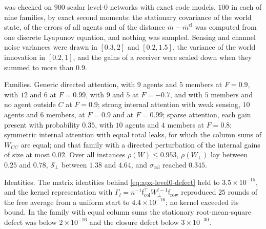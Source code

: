 \begin{numcheck}\label{chk:apx-level0}
 was checked on $900$ scalar level-0 networks with exact code models, $100$ in each of nine families, by exact second moments: the stationary covariance of the world state, of the errors of all agents and of the distance $\bar m-\bar m^{\mathrm{cl}}$ was computed from one discrete Lyapunov equation, and nothing was sampled. Sensing and channel noise variances were drawn in $[0.3,2]$ and $[0.2,1.5]$, the variance of the world innovation in $[0.2,1]$, and the gains of a receiver were scaled down when they summed to more than $0.9$.

Families. Generic directed attention, with $9$ agents and $5$ members at $F=0.9$, with $12$ and $6$ at $F=0.99$, with $9$ and $5$ at $F=-0.7$, and with $5$ members and no agent outside $C$ at $F=0.9$; strong internal attention with weak sensing, $10$ agents and $6$ members, at $F=0.9$ and at $F=0.99$; sparse attention, each gain present with probability $0.35$, with $10$ agents and $4$ members at $F=0.8$; symmetric internal attention with equal total leaks, for which the column sums of $W_{CC}$ are equal; and that family with a directed perturbation of the internal gains of size at most $0.02$. Over all instances $\rho(W)\le0.953$, $\rho(W_\perp)$ lay between $0.25$ and $0.78$, $\mathcal S_\perp$ between $1.38$ and $4.64$, and $\sigma_{\mathrm{col}}$ reached $0.345$.

Identities. The matrix identities behind \eqref{eq:apx-level0-defect} held to $3.5\times10^{-15}$, and the kernel representation with $\Gamma_l=n^{-1}\mathsf f_{\mathrm{col}}^\top W_\perp^{l-1}\mathsf f_{\mathrm{row}}$ reproduced $25$ rounds of the free average from a uniform start to $4.4\times10^{-16}$; no kernel exceeded its bound. In the family with equal column sums the stationary root-mean-square defect was below $2\times10^{-16}$ and the closure defect below $3\times10^{-30}$.


\end{numcheck}
